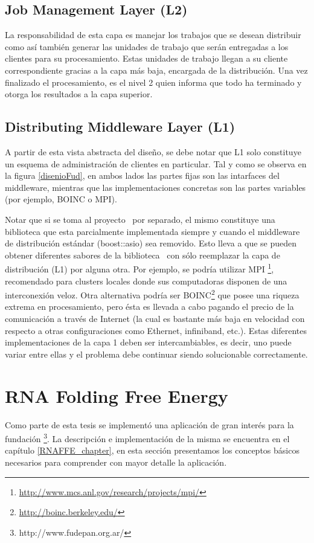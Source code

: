     \subsection{Job Management Layer (L2)}
    La responsabilidad de esta capa es manejar los trabajos que se desean distribuir como as\'i tambi\'en generar las unidades de trabajo que ser\'an
    entregadas a los clientes para su procesamiento. Estas unidades de trabajo llegan a su cliente correspondiente gracias a la capa m\'as baja, 
    encargada de la distribuci\'on. Una vez finalizado el procesamiento, es el nivel 2 quien informa que todo ha terminado y otorga los resultados a la capa superior.
  \newpage
    \subsection{Distributing Middleware Layer (L1)}
    A partir de esta vista abstracta del dise\~no, se debe notar que L1 solo constituye un esquema de administraci\'on de clientes en particular. Tal y
    como se observa en la figura \ref{disenioFud}, en ambos lados las partes fijas son las intarfaces del middleware, mientras que las
    implementaciones concretas son las partes variables (por ejemplo, BOINC o MPI).

    Notar que si se toma al proyecto \fud \ por separado, el mismo constituye una biblioteca que esta parcialmente implementada siempre y cuando el
    middleware de distribuci\'on est\'andar (boost::asio) sea removido. Esto lleva a que se pueden obtener diferentes sabores de la biblioteca \fud \
    con s\'olo reemplazar la capa de distribuci\'on (L1) por alguna otra. Por ejemplo, se podr\'ia utilizar MPI
    \footnote{\url{http://www.mcs.anl.gov/research/projects/mpi/}}, recomendado para clusters locales donde sus computadoras disponen de una 
    interconexi\'on veloz. Otra alternativa podr\'ia ser BOINC\footnote{\url{http://boinc.berkeley.edu/}} que posee una riqueza extrema en procesamiento,
    pero \'esta es llevada a cabo pagando el precio de la comunicaci\'on a trav\'es de Internet (la cual es bastante m\'as baja en velocidad con 
    respecto a otras configuraciones como Ethernet, infiniband, etc.). Estas diferentes implementaciones de la capa 1 deben ser intercambiables,
    es decir, uno puede variar entre ellas y el problema debe continuar siendo solucionable correctamente.

  \section{RNA Folding Free Energy}
  Como parte de esta tesis se implement\'o una aplicaci\'on de gran inter\'es para la fundaci\'on \fudepan \footnote{http://www.fudepan.org.ar/}. La descripci\'on
  e implementaci\'on de la misma se encuentra en el cap\'itulo \ref{RNAFFE_chapter}, en esta secci\'on presentamos los conceptos b\'asicos necesarios para comprender
  con mayor detalle la aplicaci\'on.

